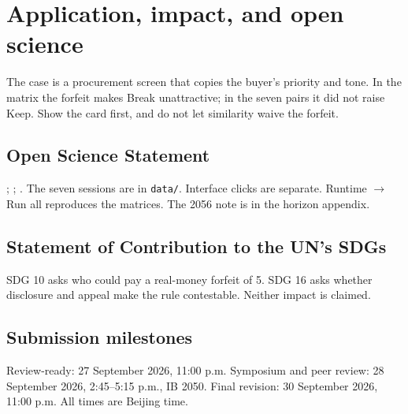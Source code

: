 \section{Application, impact, and open science}
The case is a procurement screen that copies the buyer's priority and tone. In the matrix the forfeit makes Break unattractive; in the seven pairs it did not raise Keep. Show the card first, and do not let similarity waive the forfeit.

\subsection*{Open Science Statement}
\GitHubLink; \NotebookLink; \HuggingFaceLink. The seven sessions are in \texttt{data/}. Interface clicks are separate. Runtime $\rightarrow$ Run all reproduces the matrices. The 2056 note is in the horizon appendix.

\subsection*{Statement of Contribution to the UN's SDGs}
SDG 10 asks who could pay a real-money forfeit of 5. SDG 16 asks whether disclosure and appeal make the rule contestable. Neither impact is claimed.

\subsection*{Submission milestones}
Review-ready: 27 September 2026, 11:00 p.m. Symposium and peer review: 28 September 2026, 2:45--5:15 p.m., IB 2050. Final revision: 30 September 2026, 11:00 p.m. All times are Beijing time.
